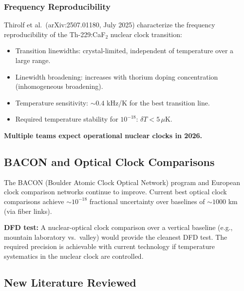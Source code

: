 \documentclass[11pt]{article}
\begin{document}
\subsubsection{Frequency Reproducibility}

Thirolf et al.\ (arXiv:2507.01180, July 2025) characterize the
frequency reproducibility of the Th-229:CaF$_2$ nuclear clock
transition:
\begin{itemize}
  \item Transition linewidths: crystal-limited, independent of
    temperature over a large range.
  \item Linewidth broadening: increases with thorium doping
    concentration (inhomogeneous broadening).
  \item Temperature sensitivity: $\sim 0.4$ kHz/K for the
    best transition line.
  \item Required temperature stability for $10^{-18}$:
    $\delta T < 5\,\mu$K.
\end{itemize}

\textbf{Multiple teams expect operational nuclear clocks in 2026.}

\subsection{BACON and Optical Clock Comparisons}

The BACON (Boulder Atomic Clock Optical Network) program and European
clock comparison networks continue to improve. Current best optical
clock comparisons achieve $\sim 10^{-18}$ fractional uncertainty over
baselines of $\sim 1000$ km (via fiber links).

\textbf{DFD test:} A nuclear-optical clock comparison over a
vertical baseline (e.g., mountain laboratory vs.\ valley) would
provide the cleanest DFD test. The required precision is achievable
with current technology if temperature systematics in the nuclear
clock are controlled.

\subsection{New Literature Reviewed}
\end{document}
